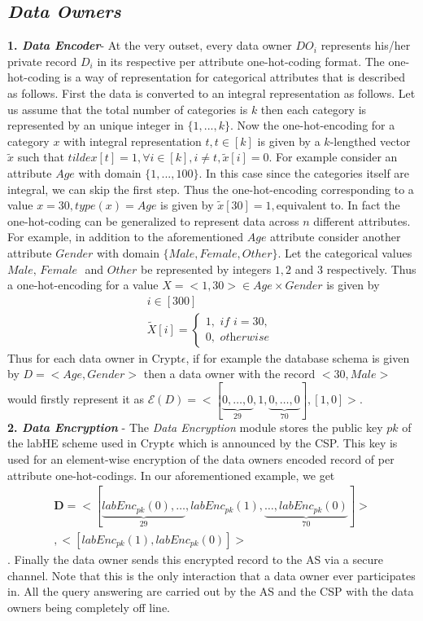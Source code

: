 \subsection*{\textit{Data Owners}}
\textbf{1. \textit{Data Encoder}}-  At the very outset, every data owner  $DO_i$ represents his/her private record $D_i$ in its respective per attribute one-hot-coding format. The one-hot-coding is a way of representation for categorical attributes that is described as follows. First the data is converted to an integral representation as follows. Let us assume that the total number of categories is $k$ then each category is represented by an unique integer in $\{1,..., k\}$. Now the one-hot-encoding for a category $x$ with integral representation $t , t \in [k]$ is given by a $k$-lengthed vector $\tilde{x}$ such that $tilde{x}[t]=1, \forall i \in [k], i\neq t, \tilde{x}[i]=0$. 
For example consider an attribute $Age$ with domain $\{1,...,100\}$. In this case since the categories itself are integral, we can skip the first step. Thus the one-hot-encoding corresponding to a value $x=30, type(x)=Age$ is given by $\tilde{x}[30]=1, $equivalent to. In fact the one-hot-coding can be generalized to  represent data across $n$ different attributes. For example, in addition to the aforementioned $Age$ attribute consider  another attribute  $Gender$ with domain $\{Male, Female, Other\}$. Let the categorical values $\textit{Male, Female }$ and $Other$ be represented by integers $1, 2$ and $3$ respectively. Thus a one-hot-encoding for a value $X=<1,30> \in Age \times Gender$ is given by \begin{gather*}i \in [300] \\\tilde{X}[i]=\begin{cases}1, \textit{ if } i =30,\\ 0 , \textit{ otherwise }\end{cases}\end{gather*}
Thus for each data owner in Crypt$\epsilon$, if for example  the database schema is given by  $D=<Age,Gender>$ then a data owner with the record $<30, Male>$ would firstly represent it as $\mathcal{E}(D)=<[\underbrace{0,\ldots,0}_{29},1,\underbrace{0,\ldots,0}_{70}],[1,0]>$. \\
\textbf{2. \textit{Data Encryption}} - The \textit{Data Encryption} module stores the public key $pk$ of the labHE scheme used in Crypt$\epsilon$ which is announced by the CSP. This key is used for an element-wise encryption of the data owners encoded record of per attribute one-hot-codings. In our aforementioned example, we get \begin{gather*}\mathbf{D}=<[\underbrace{labEnc_{pk}(0),\ldots}_{29},labEnc_{pk}(1),\underbrace{\ldots,labEnc_{pk}(0)}_{70}]>\\,
<[labEnc_{pk}(1),labEnc_{pk}(0)]>\end{gather*}. Finally the data owner sends this encrypted record to the AS via a secure channel. Note that this is the only interaction that a data owner ever participates in. All the query answering are carried out by the AS and the CSP with the data owners being completely off line.
